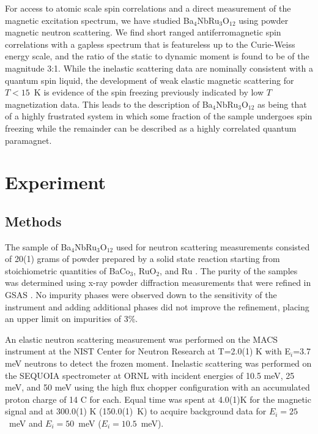 \documentclass[%
 reprint,
superscriptaddress,
 amsmath,amssymb,
 aps,
 prb,
]{revtex4-2}
\begin{document}
For access to atomic scale spin correlations and a direct measurement of the magnetic excitation spectrum, we have studied Ba$_4$NbRu$_3$O$_{12}$ using powder magnetic neutron scattering. We find short ranged antiferromagnetic spin correlations with a gapless spectrum that is featureless up to the Curie-Weiss energy scale, and the ratio of the static to dynamic moment is found to be of the magnitude 3:1. While the inelastic scattering data are nominally consistent with a quantum spin liquid, the development of weak elastic magnetic scattering for $T<15$~K is evidence of the spin freezing previously indicated by low $T$ magnetization data. This leads to the description of Ba$_4$NbRu$_3$O$_{12}$ as being that of a highly frustrated system in which some fraction of the sample undergoes spin freezing while the remainder can be described as a highly correlated quantum paramagnet.


\section{Experiment}

\subsection{Methods}
The sample of Ba$_4$NbRu$_3$O$_{12}$ used for neutron scattering measurements consisted of 20(1) grams of powder prepared by a solid state reaction starting from stoichiometric quantities of BaCo$_3$, RuO$_2$, and Ru \cite{Nguyen2018GeometricallyInsulator}. The purity of the samples was determined using x-ray powder diffraction measurements that were refined in GSAS \cite{gsas}. No impurity phases were observed down to the sensitivity of the instrument and adding additional phases did not improve the refinement, placing an upper limit on impurities of 3\%. 

An elastic neutron scattering measurement was performed on the MACS instrument \cite{MACS_citation} at the NIST Center for Neutron Research at T=2.0(1) K with E$_i$=3.7 meV neutrons to detect the frozen moment. Inelastic scattering was performed on the SEQUOIA spectrometer \cite{Granroth2010SEQUOIA:SNS} at ORNL with incident energies of 10.5 meV, 25 meV, and 50 meV using the high flux chopper configuration with an accumulated proton charge of 14 C for each. Equal time was spent at 4.0(1)K for the magnetic signal and at 300.0(1) K (150.0(1)~K)  to acquire background data for $E_i=25$~meV and $E_i=50$~meV ($E_i=10.5$~meV). 
\end{document}
